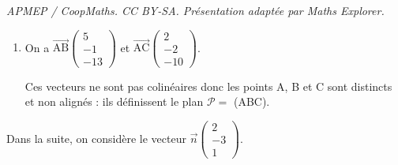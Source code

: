 \documentclass[10pt]{article}
\providecommand{\vect}[1]{\overrightarrow{#1}}
\begin{document}
\noindent\textit{APMEP / CoopMaths. CC BY-SA. Présentation adaptée par Maths Explorer.}\par\medskip
\medskip




















\begin{enumerate}
	\item 
On a $\vect{\text{AB}}\begin{pmatrix}5\\-1\\- 13\end{pmatrix}$ et $\vect{\text{AC}}\begin{pmatrix}2\\-2\\- 10\end{pmatrix}$.

Ces vecteurs ne sont pas colinéaires donc les points A, B et C  sont distincts et non alignés : ils définissent le plan $\mathcal{P} = $ (ABC).
\end{enumerate}

Dans la suite, on considère le vecteur $\vect{n} \begin{pmatrix}2\\-3\\1\end{pmatrix}$.
\end{document}
